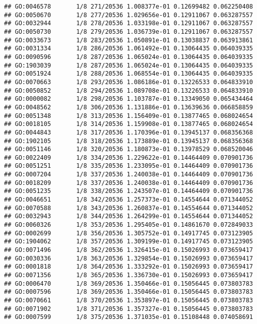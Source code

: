 \documentclass[
]{article}
\begin{document}
\begin{verbatim}
## GO:0046578       1/8 271/20536 1.008377e-01 0.12699482 0.062250408
## GO:0050670       1/8 277/20536 1.029656e-01 0.12911067 0.063287557
## GO:0032944       1/8 278/20536 1.033198e-01 0.12911067 0.063287557
## GO:0050730       1/8 279/20536 1.036739e-01 0.12911067 0.063287557
## GO:0033673       1/8 283/20536 1.050891e-01 0.13038837 0.063913861
## GO:0031334       1/8 286/20536 1.061492e-01 0.13064435 0.064039335
## GO:0090596       1/8 287/20536 1.065024e-01 0.13064435 0.064039335
## GO:1903039       1/8 287/20536 1.065024e-01 0.13064435 0.064039335
## GO:0051924       1/8 288/20536 1.068554e-01 0.13064435 0.064039335
## GO:0070663       1/8 293/20536 1.086186e-01 0.13226533 0.064833910
## GO:0050852       1/8 294/20536 1.089708e-01 0.13226533 0.064833910
## GO:0000082       1/8 298/20536 1.103787e-01 0.13349050 0.065434464
## GO:0048562       1/8 306/20536 1.131886e-01 0.13639636 0.066858859
## GO:0051348       1/8 313/20536 1.156409e-01 0.13877465 0.068024654
## GO:0018105       1/8 314/20536 1.159908e-01 0.13877465 0.068024654
## GO:0044843       1/8 317/20536 1.170396e-01 0.13945137 0.068356368
## GO:1902105       1/8 318/20536 1.173889e-01 0.13945137 0.068356368
## GO:0051146       1/8 320/20536 1.180873e-01 0.13978529 0.068520046
## GO:0022409       1/8 334/20536 1.229622e-01 0.14464409 0.070901736
## GO:0051251       1/8 335/20536 1.233095e-01 0.14464409 0.070901736
## GO:0007204       1/8 337/20536 1.240038e-01 0.14464409 0.070901736
## GO:0018209       1/8 337/20536 1.240038e-01 0.14464409 0.070901736
## GO:0051235       1/8 338/20536 1.243507e-01 0.14464409 0.070901736
## GO:0046651       1/8 342/20536 1.257373e-01 0.14554644 0.071344052
## GO:0070588       1/8 343/20536 1.260837e-01 0.14554644 0.071344052
## GO:0032943       1/8 344/20536 1.264299e-01 0.14554644 0.071344052
## GO:0060326       1/8 353/20536 1.295405e-01 0.14861670 0.072849033
## GO:0002699       1/8 356/20536 1.305752e-01 0.14917745 0.073123905
## GO:1904062       1/8 357/20536 1.309199e-01 0.14917745 0.073123905
## GO:0071496       1/8 362/20536 1.326415e-01 0.15026993 0.073659417
## GO:0030336       1/8 363/20536 1.329854e-01 0.15026993 0.073659417
## GO:0001818       1/8 364/20536 1.333292e-01 0.15026993 0.073659417
## GO:0071356       1/8 365/20536 1.336730e-01 0.15026993 0.073659417
## GO:0006470       1/8 369/20536 1.350466e-01 0.15056445 0.073803783
## GO:0007596       1/8 369/20536 1.350466e-01 0.15056445 0.073803783
## GO:0070661       1/8 370/20536 1.353897e-01 0.15056445 0.073803783
## GO:0071902       1/8 371/20536 1.357327e-01 0.15056445 0.073803783
## GO:0007599       1/8 375/20536 1.371035e-01 0.15108448 0.074058691

\end{verbatim}
\end{document}
